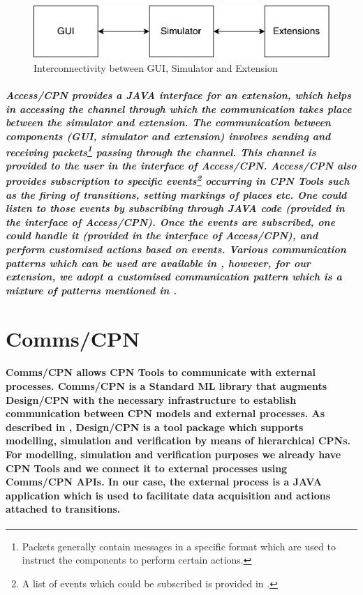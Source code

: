 {{\begin{figure}[!htbp]
	\centering
	\includegraphics[scale = 0.35]{DBN_Impl_CPN_Tools_Architecture_Extension.pdf}
	\caption{Interconnectivity between GUI, Simulator and Extension}
	\label{fig:DBN_Impl_CPN_Tools_Architecture_Extension}
\end{figure}}}

\subparagraph*{\textnormal{Access/CPN provides a JAVA interface for an extension, which helps in accessing the \textit{channel} through which the communication takes place between the simulator and extension. The communication between components (GUI, simulator and extension) involves sending and receiving \textit{packets}\footnote{Packets generally contain messages in a specific format which are used to instruct the components to perform certain actions.} passing through the channel. This \textit{channel} is provided to the user in the  interface of Access/CPN. Access/CPN also provides subscription to specific events\footnote{A list of events which could be subscribed is provided in \cite{CPN_Tools_Message_Format}.} occurring in CPN Tools such as the firing of transitions, setting markings of places etc. One could listen to those events by subscribing through JAVA code (provided in the  interface of Access/CPN). Once the events are subscribed, one could \textit{handle} it (provided in the  interface of Access/CPN), and perform customised actions based on events. Various communication patterns which can be used are available in \cite{CPN_Tools_Extension}, however, for our extension, we adopt a customised communication pattern which is a mixture of patterns mentioned in \cite{CPN_Tools_Extension}.}}

\section{Comms/CPN}
\label{sec:DBN_Impl_Comms_CPN}
\paragraph*{\textnormal{Comms/CPN allows CPN Tools to communicate with external processes. Comms/CPN \cite{gallasch2001comms} is a Standard ML library that augments Design/CPN \cite{Design_CPN} with the necessary infrastructure to establish communication between CPN models and external processes. As described in \cite{Design_CPN}, Design/CPN is a tool package which supports modelling, simulation and verification by means of hierarchical CPNs. For modelling, simulation and verification purposes we already have CPN Tools and we connect it to external processes using Comms/CPN APIs. In our case, the external process is a JAVA application which is used to facilitate data acquisition and actions attached to transitions.}}

